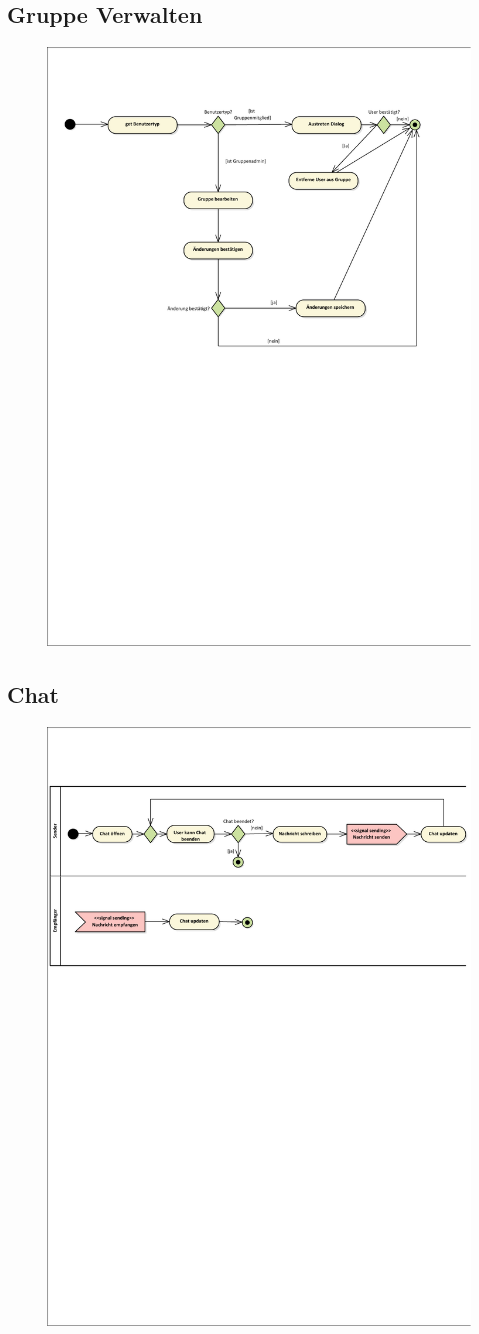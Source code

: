 \subsection*{Gruppe Verwalten}
\begin{figure}[h!]
	\centering
	\includegraphics[width=0.8\linewidth]{docs/3_Aktivitaetsdiagramme/Richard/gruppe_verwalten.pdf}
	\label{fig:ActDia_Gruppe_Verwalten}
\end{figure}

\vfill
\pagebreak
\vfill

\subsection*{Chat}
\begin{figure}[h!]
	\centering
	\includegraphics[width=0.8\linewidth]{docs/3_Aktivitaetsdiagramme/Richard/chat.pdf}
	\label{fig:ActDia_Chat}
\end{figure}
